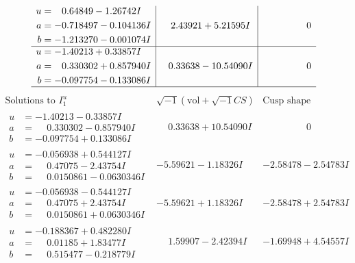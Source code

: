 \documentclass[1p]{elsarticle_modified}
\theoremstyle{definition}
\newcommand{\I}{\sqrt{-1}}
\begin{document}
$$\begin{array}{c|c|c}
\begin{aligned}
u &= \phantom{-}0.64849 - 1.26742 I \\
a &= -0.718497 - 0.104136 I \\
b &= -1.213270 - 0.001074 I\end{aligned}
 & \phantom{-}2.43921 + 5.21595 I & \phantom{-0.000000 } 0 \\ \hline\begin{aligned}
u &= -1.40213 + 0.33857 I \\
a &= \phantom{-}0.330302 + 0.857940 I \\
b &= -0.097754 - 0.133086 I\end{aligned}
 & \phantom{-}0.33638 - 10.54090 I & \phantom{-0.000000 } 0\\
 \hline 
 \end{array}$$\newpage$$\begin{array}{c|c|c}  
\text{Solutions to }I^u_{1}& \I (\text{vol} + \sqrt{-1}CS) & \text{Cusp shape}\\
 \hline 
\begin{aligned}
u &= -1.40213 - 0.33857 I \\
a &= \phantom{-}0.330302 - 0.857940 I \\
b &= -0.097754 + 0.133086 I\end{aligned}
 & \phantom{-}0.33638 + 10.54090 I & \phantom{-0.000000 } 0 \\ \hline\begin{aligned}
u &= -0.056938 + 0.544127 I \\
a &= \phantom{-}0.47075 - 2.43754 I \\
b &= \phantom{-}0.0150861 - 0.0630346 I\end{aligned}
 & -5.59621 - 1.18326 I & -2.58478 - 2.54783 I \\ \hline\begin{aligned}
u &= -0.056938 - 0.544127 I \\
a &= \phantom{-}0.47075 + 2.43754 I \\
b &= \phantom{-}0.0150861 + 0.0630346 I\end{aligned}
 & -5.59621 + 1.18326 I & -2.58478 + 2.54783 I \\ \hline\begin{aligned}
u &= -0.188367 + 0.482280 I \\
a &= \phantom{-}0.01185 + 1.83477 I \\
b &= \phantom{-}0.515477 - 0.218779 I\end{aligned}
 & \phantom{-}1.59907 - 2.42394 I & -1.69948 + 4.54557 I \\ \hline\begin{aligned}

\end{aligned}
\end{array}$$
\end{document}
